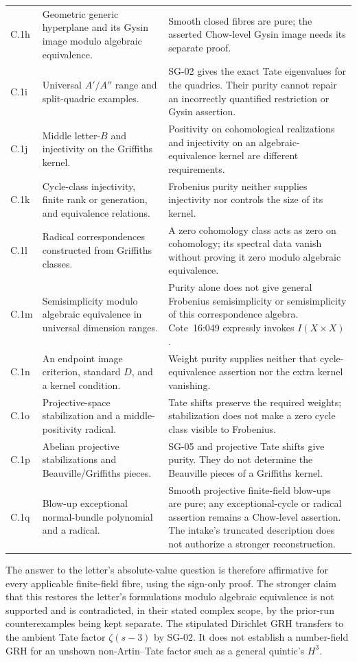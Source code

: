 {\begin{longtable}{@{}p{}p{}p{}@{}}
C.1h & Geometric generic hyperplane and its Gysin image modulo algebraic equivalence. & Smooth closed fibres are pure; the asserted Chow-level Gysin image needs its separate proof. \\
C.1i & Universal $A'/A''$ range and split-quadric examples. & SG-02 gives the exact Tate eigenvalues for the quadrics. Their purity cannot repair an incorrectly quantified restriction or Gysin assertion. \\
C.1j & Middle letter-$B$ and injectivity on the Griffiths kernel. & Positivity on cohomological realizations and injectivity on an algebraic-equivalence kernel are different requirements. \\
C.1k & Cycle-class injectivity, finite rank or generation, and equivalence relations. & Frobenius purity neither supplies injectivity nor controls the size of its kernel. \\
C.1l & Radical correspondences constructed from Griffiths classes. & A zero cohomology class acts as zero on cohomology; its spectral data vanish without proving it zero modulo algebraic equivalence. \\
C.1m & Semisimplicity modulo algebraic equivalence in universal dimension ranges. & Purity alone does not give general Frobenius semisimplicity or semisimplicity of this correspondence algebra. Cote~16:049 expressly invokes $I(X\times X)$. \\
C.1n & An endpoint image criterion, standard $D$, and a kernel condition. & Weight purity supplies neither that cycle-equivalence assertion nor the extra kernel vanishing. \\
C.1o & Projective-space stabilization and a middle-positivity radical. & Tate shifts preserve the required weights; stabilization does not make a zero cycle class visible to Frobenius. \\
C.1p & Abelian projective stabilizations and Beauville/Griffiths pieces. & SG-05 and projective Tate shifts give purity. They do not determine the Beauville pieces of a Griffiths kernel. \\
C.1q & Blow-up exceptional normal-bundle polynomial and a radical. & Smooth projective finite-field blow-ups are pure; any exceptional-cycle or radical assertion remains a Chow-level assertion. The intake's truncated description does not authorize a stronger reconstruction. \\
\bottomrule
\end{longtable}
}

The answer to the letter's absolute-value question is therefore affirmative for every applicable finite-field fibre, using the sign-only proof. The stronger claim that this restores the letter's formulations modulo algebraic equivalence is not supported and is contradicted, in their stated complex scope, by the prior-run counterexamples being kept separate. The stipulated Dirichlet GRH transfers to the ambient Tate factor $\zeta(s-3)$ by SG-02. It does not establish a number-field GRH for an unshown non-Artin--Tate factor such as a general quintic's $H^3$.

